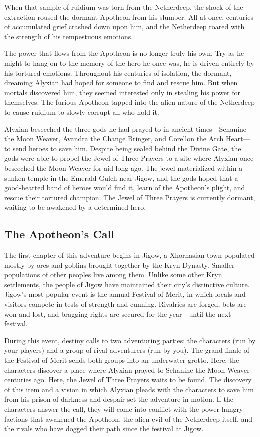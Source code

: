\documentclass[10pt,a4paper,twoside,twocolumn,openany,nodeprecatedcode]{dndbook}
\begin{document}
When that sample of ruidium was torn from the Netherdeep, the shock of the extraction roused the dormant Apotheon from his slumber. All at once, centuries of accumulated grief crashed down upon him, and the Netherdeep roared with the strength of his tempestuous emotions.

The power that flows from the Apotheon is no longer truly his own. Try as he might to hang on to the memory of the hero he once was, he is driven entirely by his tortured emotions. Throughout his centuries of isolation, the dormant, dreaming Alyxian had hoped for someone to find and rescue him. But when mortals discovered him, they seemed interested only in stealing his power for themselves. The furious Apotheon tapped into the alien nature of the Netherdeep to cause ruidium to slowly corrupt all who hold it.

Alyxian beseeched the three gods he had prayed to in ancient times—Sehanine the Moon Weaver, Avandra the Change Bringer, and Corellon the Arch Heart—to send heroes to save him. Despite being sealed behind the Divine Gate, the gods were able to propel the Jewel of Three Prayers to a site where Alyxian once beseeched the Moon Weaver for aid long ago. The jewel materialized within a sunken temple in the Emerald Gulch near Jigow, and the gods hoped that a good-hearted band of heroes would find it, learn of the Apotheon's plight, and rescue their tortured champion. The Jewel of Three Prayers is currently dormant, waiting to be awakened by a determined hero.

\subsection{The Apotheon's Call}
The first chapter of this adventure begins in Jigow, a Xhorhasian town populated mostly by orcs and goblins brought together by the Kryn Dynasty. Smaller populations of other peoples live among them. Unlike some other Kryn settlements, the people of Jigow have maintained their city's distinctive culture. Jigow's most popular event is the annual Festival of Merit, in which locals and visitors compete in tests of strength and cunning. Rivalries are forged, bets are won and lost, and bragging rights are secured for the year—until the next festival.

During this event, destiny calls to two adventuring parties: the characters (run by your players) and a group of rival adventurers (run by you). The grand finale of the Festival of Merit sends both groups into an underwater grotto. Here, the characters discover a place where Alyxian prayed to Sehanine the Moon Weaver centuries ago. Here, the Jewel of Three Prayers waits to be found. The discovery of this item and a vision in which Alyxian pleads with the characters to save him from his prison of darkness and despair set the adventure in motion. If the characters answer the call, they will come into conflict with the power-hungry factions that awakened the Apotheon, the alien evil of the Netherdeep itself, and the rivals who have dogged their path since the festival at Jigow.
\end{document}
